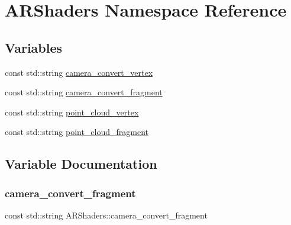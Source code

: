 \hypertarget{namespace_a_r_shaders}{}\section{A\+R\+Shaders Namespace Reference}
\label{namespace_a_r_shaders}
\subsection*{Variables}
\begin{DoxyCompactItemize}
\item 
const std\+::string \mbox{\hyperlink{namespace_a_r_shaders_a3c22292f0a3f936dec68c88539ff258b}{camera\+\_\+convert\+\_\+vertex}}
\item 
const std\+::string \mbox{\hyperlink{namespace_a_r_shaders_a7ad85c6ac56fd64d97461423e022c3ef}{camera\+\_\+convert\+\_\+fragment}}
\item 
const std\+::string \mbox{\hyperlink{namespace_a_r_shaders_ada1162901271506088cc985d466c8971}{point\+\_\+cloud\+\_\+vertex}}
\item 
const std\+::string \mbox{\hyperlink{namespace_a_r_shaders_ad415abff7a73d38ae981dd4be29a7076}{point\+\_\+cloud\+\_\+fragment}}
\end{DoxyCompactItemize}


\subsection{Variable Documentation}
\mbox{\label{namespace_a_r_shaders_a7ad85c6ac56fd64d97461423e022c3ef}} 
\subsubsection{\texorpdfstring{camera\+\_\+convert\+\_\+fragment}{camera\_convert\_fragment}}
{\footnotesize\ttfamily const std\+::string A\+R\+Shaders\+::camera\+\_\+convert\+\_\+fragment}

\mbox{\label{namespace_a_r_shaders_a3c22292f0a3f936dec68c88539ff258b}} 
